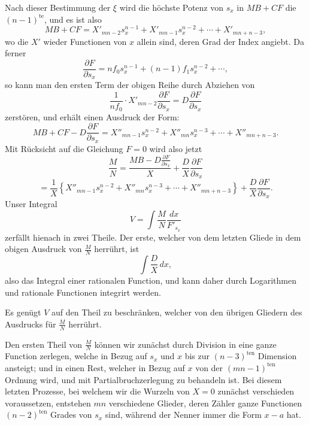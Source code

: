 \documentclass[10pt]{article}
\begin{document}
Nach dieser Bestimmung der $\xi$ wird die höchste Potenz von $s_x$ in $MB+CF$ die $(n-1)^{\mathrm{te}}$, und es ist also
\[
MB+CF=X'_{mn-2}s_x^{n-1}+X'_{mn-1}s_x^{n-2}+\cdots+X'_{mn+n-3},
\]
wo die $X'$ wieder Functionen von $x$ allein sind, deren Grad der Index angiebt. Da ferner
\[
\frac{\partial F}{\partial s_x}=nf_0s_x^{n-1}+(n-1)f_1s_x^{n-2}+\cdots,
\]
so kann man den ersten Term der obigen Reihe durch Abziehen von
\[
\frac{1}{nf_0}\cdot X'_{mn-2}\frac{\partial F}{\partial s_x}=D\frac{\partial F}{\partial s_x}
\]
zerstören, und erhält einen Ausdruck der Form:
\[
MB+CF-D\frac{\partial F}{\partial s_x}=X''_{mn-1}s_x^{n-2}+X''_{mn}s_x^{n-3}+\cdots+X''_{mn+n-3}.
\]
Mit Rücksicht auf die Gleichung $F=0$ wird also jetzt
\[
\frac{M}{N}=\frac{MB-D\frac{\partial F}{\partial s_x}}{X}+\frac{D}{X}\frac{\partial F}{\partial s_x}
\]
\[
=\frac{1}{X}\left\{X''_{mn-1}s_x^{n-2}+X''_{mn}s_x^{n-3}+\cdots+X''_{mn+n-3}\right\}+\frac{D}{X}\frac{\partial F}{\partial s_x}.
\]
Unser Integral
\[
V=\int\frac{M}{N}\frac{dx}{F'_{s_x}}
\]
zerfällt hienach in zwei Theile. Der erste, welcher von dem letzten Gliede in dem obigen Ausdruck von $\frac{M}{N}$ herrührt, ist
\[
\int\frac{D}{X}\,dx,
\]
also das Integral einer rationalen Function, und kann daher durch Logarithmen und rationale Functionen integrirt werden.

Es genügt $V$ auf den Theil zu beschränken, welcher von den übrigen Gliedern des Ausdrucks für $\frac{M}{N}$ herrührt.

Den ersten Theil von $\frac{M}{N}$ können wir zunächst durch Division in eine ganze Function zerlegen, welche in Bezug auf $s_x$ und $x$ bis zur $(n-3)^{\mathrm{ten}}$ Dimension ansteigt; und in einen Rest, welcher in Bezug auf $x$ von der $(mn-1)^{\mathrm{ten}}$ Ordnung wird, und mit Partialbruchzerlegung zu behandeln ist. Bei diesem letzten Prozesse, bei welchem wir die Wurzeln von $X=0$ zunächst verschieden voraussetzen, entstehen $mn$ verschiedene Glieder, deren Zähler ganze Functionen $(n-2)^{\mathrm{ten}}$ Grades von $s_x$ sind, während der Nenner immer die Form $x-a$ hat.
\end{document}
